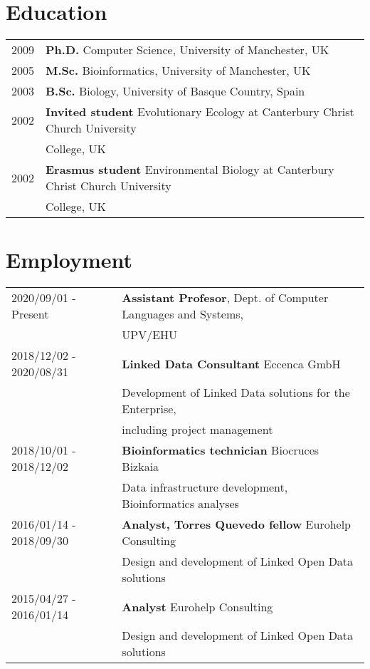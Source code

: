 \documentclass[11pt,fullpage]{article}
\begin{document}

\section*{Education}

\begin{tabular}{ll}
	2009 & {\bf Ph.D.} Computer Science, University of Manchester, UK \\
	2005 & {\bf M.Sc.} Bioinformatics, University of Manchester, UK \\
	2003 & {\bf B.Sc.} Biology, University of Basque Country, Spain \\
	2002 & {\bf Invited student} Evolutionary Ecology at Canterbury Christ Church University \\
	     & College, UK \\
	2002 & {\bf Erasmus student} Environmental Biology at Canterbury Christ Church University \\
	     & College, UK \\
\end{tabular}

\section*{Employment}


\begin{tabular}{ll}
2020/09/01 - Present & {\bf Assistant Profesor}, Dept. of Computer Languages and Systems, \\
                    & UPV/EHU \\
2018/12/02 - 2020/08/31 & {\bf Linked Data Consultant} Eccenca GmbH \\
      & Development of Linked Data solutions for the Enterprise, \\ 
      & including project management\\
2018/10/01 - 2018/12/02 & {\bf Bioinformatics technician} Biocruces Bizkaia \\
      & Data infrastructure development, Bioinformatics analyses \\
2016/01/14 - 2018/09/30 & {\bf Analyst, Torres Quevedo fellow} Eurohelp Consulting \\
	      & Design and development of Linked Open Data solutions\\
 2015/04/27 -  2016/01/14 & {\bf Analyst} Eurohelp Consulting \\
	    & Design and development of Linked Open Data solutions\\
\end{tabular}
\end{document}
